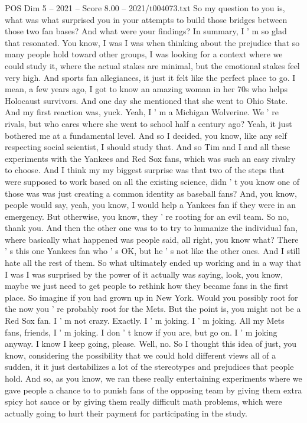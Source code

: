 \begin{textsample}{POS Dim 5 – 2021 – Score 8.00 – 2021/t004073.txt}
So my question to you is, what was what surprised you in your attempts to build those bridges between those two fan bases?
And what were your findings?
In summary, I ' m so glad that resonated.
You know, I was I was when thinking about the prejudice that so many people hold toward other groups, I was looking for a context where we could study it, where the actual stakes are minimal, but the emotional stakes feel very high.
And sports fan allegiances, it just it felt like the perfect place to go.
I mean, a few years ago, I got to know an amazing woman in her 70s who helps Holocaust survivors.
And one day she mentioned that she went to Ohio State.
And my first reaction was, yuck.
Yeah, I ' m a Michigan Wolverine.
We ' re rivals, but who cares where she went to school half a century ago?
Yeah, it just bothered me at a fundamental level.
And so I decided, you know, like any self respecting social scientist, I should study that.
And so Tim and I and all these experiments with the Yankees and Red Sox fans, which was such an easy rivalry to choose.
And I think my my biggest surprise was that two of the steps that were supposed to work based on all the existing science, didn ' t you know one of those was was just creating a common identity as baseball fans?
And, you know, people would say, yeah, you know, I would help a Yankees fan if they were in an emergency.
But otherwise, you know, they ' re rooting for an evil team.
So no, thank you.
And then the other one was to to try to humanize the individual fan, where basically what happened was people said, all right, you know what?
There ' s this one Yankees fan who ' s OK, but he ' s not like the other ones.
And I still hate all the rest of them.
So what ultimately ended up working and in a way that I was I was surprised by the power of it actually was saying, look, you know, maybe we just need to get people to rethink how they became fans in the first place.
So imagine if you had grown up in New York.
Would you possibly root for the now you ' re probably root for the Mets.
But the point is, you might not be a Red Sox fan.
I ' m not crazy.
Exactly.
I ' m joking.
I ' m joking.
All my Mets fans, friends, I ' m joking.
I don ' t know if you are, but go on.
I ' m joking anyway.
I know I keep going, please.
Well, no.
So I thought this idea of just, you know, considering the possibility that we could hold different views all of a sudden, it it just destabilizes a lot of the stereotypes and prejudices that people hold.
And so, as you know, we ran these really entertaining experiments where we gave people a chance to to punish fans of the opposing team by giving them extra spicy hot sauce or by giving them really difficult math problems, which were actually going to hurt their payment for participating in the study.

\end{textsample}
